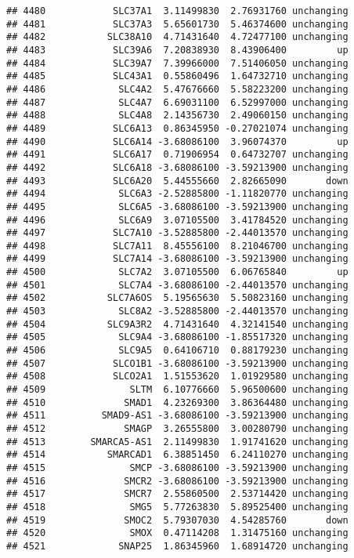 \documentclass[]{article}
\begin{document}
\begin{verbatim}
## 4480            SLC37A1  3.11499830  2.76931760 unchanging
## 4481            SLC37A3  5.65601730  5.46374600 unchanging
## 4482           SLC38A10  4.71431640  4.72477100 unchanging
## 4483            SLC39A6  7.20838930  8.43906400         up
## 4484            SLC39A7  7.39966000  7.51406050 unchanging
## 4485            SLC43A1  0.55860496  1.64732710 unchanging
## 4486             SLC4A2  5.47676660  5.58223200 unchanging
## 4487             SLC4A7  6.69031100  6.52997000 unchanging
## 4488             SLC4A8  2.14356730  2.49060150 unchanging
## 4489            SLC6A13  0.86345950 -0.27021074 unchanging
## 4490            SLC6A14 -3.68086100  3.96074370         up
## 4491            SLC6A17  0.71906954  0.64732707 unchanging
## 4492            SLC6A18 -3.68086100 -3.59213900 unchanging
## 4493            SLC6A20  5.44555660  2.82665090       down
## 4494             SLC6A3 -2.52885800 -1.11820770 unchanging
## 4495             SLC6A5 -3.68086100 -3.59213900 unchanging
## 4496             SLC6A9  3.07105500  3.41784520 unchanging
## 4497            SLC7A10 -3.52885800 -2.44013570 unchanging
## 4498            SLC7A11  8.45556100  8.21046700 unchanging
## 4499            SLC7A14 -3.68086100 -3.59213900 unchanging
## 4500             SLC7A2  3.07105500  6.06765840         up
## 4501             SLC7A4 -3.68086100 -2.44013570 unchanging
## 4502           SLC7A6OS  5.19565630  5.50823160 unchanging
## 4503             SLC8A2 -3.52885800 -2.44013570 unchanging
## 4504           SLC9A3R2  4.71431640  4.32141540 unchanging
## 4505             SLC9A4 -3.68086100 -1.85517320 unchanging
## 4506             SLC9A5  0.64106710  0.88179230 unchanging
## 4507            SLCO1B1 -3.68086100 -3.59213900 unchanging
## 4508            SLCO2A1  1.51553620  1.01929580 unchanging
## 4509               SLTM  6.10776660  5.96500600 unchanging
## 4510              SMAD1  4.23269300  3.86364480 unchanging
## 4511          SMAD9-AS1 -3.68086100 -3.59213900 unchanging
## 4512              SMAGP  3.26555800  3.00280790 unchanging
## 4513        SMARCA5-AS1  2.11499830  1.91741620 unchanging
## 4514           SMARCAD1  6.38851450  6.24110270 unchanging
## 4515               SMCP -3.68086100 -3.59213900 unchanging
## 4516              SMCR2 -3.68086100 -3.59213900 unchanging
## 4517              SMCR7  2.55860500  2.53714420 unchanging
## 4518               SMG5  5.77263830  5.89525400 unchanging
## 4519              SMOC2  5.79307030  4.54285760       down
## 4520               SMOX  0.47114208  1.31475160 unchanging
## 4521             SNAP25  1.86345960  1.68914720 unchanging

\end{verbatim}
\end{document}
